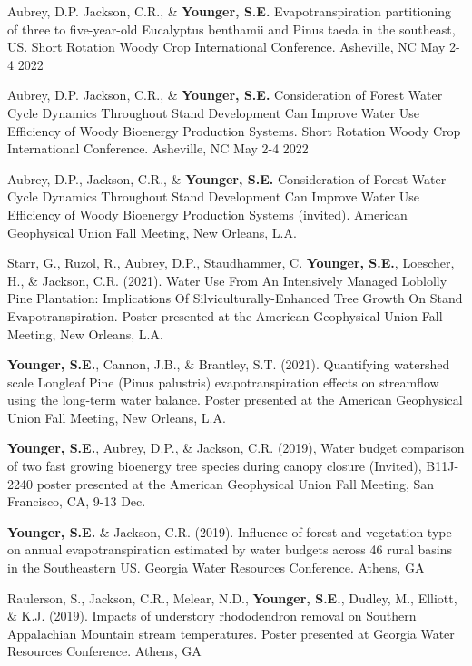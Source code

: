 \documentclass[10pt,letterpaper]{article}
\begin{document}
	\begin{hangparas}{.25in}{1}
		
		Aubrey, D.P. Jackson, C.R., \& \textbf{Younger, S.E.} Evapotranspiration partitioning of three to five-year-old Eucalyptus benthamii and Pinus taeda in the southeast, US. Short Rotation Woody Crop International Conference. Asheville, NC May 2-4 2022
		
		Aubrey, D.P. Jackson, C.R., \& \textbf{Younger, S.E.} Consideration of Forest Water Cycle Dynamics Throughout Stand Development Can Improve Water Use Efficiency of Woody Bioenergy Production Systems. Short Rotation Woody Crop International Conference. Asheville, NC May 2-4 2022
		
		Aubrey, D.P., Jackson, C.R., \& \textbf{Younger, S.E.} Consideration of Forest Water Cycle Dynamics Throughout Stand Development Can Improve Water Use Efficiency of Woody Bioenergy Production Systems (invited). American Geophysical Union Fall Meeting, New Orleans, L.A.
		
		Starr, G., Ruzol, R., Aubrey, D.P., Staudhammer, C. \textbf{Younger, S.E.}, Loescher, H., \& Jackson, C.R. (2021). Water Use From An Intensively Managed Loblolly Pine Plantation: Implications Of Silviculturally-Enhanced Tree Growth On Stand Evapotranspiration. Poster presented at the American Geophysical Union Fall Meeting, New Orleans, L.A.
		
		\textbf{Younger, S.E.}, Cannon, J.B., \& Brantley, S.T. (2021). Quantifying watershed scale Longleaf Pine (Pinus palustris) evapotranspiration effects on streamflow using the long-term water balance. Poster presented at the American Geophysical Union Fall Meeting, New Orleans, L.A.
		
		\textbf{Younger, S.E.}, Aubrey, D.P., \& Jackson, C.R. (2019), Water budget comparison of two fast growing bioenergy tree species during canopy closure (Invited), B11J-2240 poster presented at the American Geophysical Union Fall Meeting, San Francisco, CA, 9-13 Dec.
		
		\textbf{Younger, S.E.} \& Jackson, C.R. (2019). Influence of forest and vegetation type on annual evapotranspiration estimated by water budgets across 46 rural basins in the Southeastern US. Georgia Water Resources Conference. Athens, GA
		
		Raulerson, S., Jackson, C.R., Melear, N.D., \textbf{Younger, S.E.}, Dudley, M., Elliott, \& K.J. (2019). Impacts of understory rhododendron removal on Southern Appalachian Mountain stream temperatures. Poster presented at Georgia Water Resources Conference. Athens, GA
		

\end{hangparas}
\end{document}
